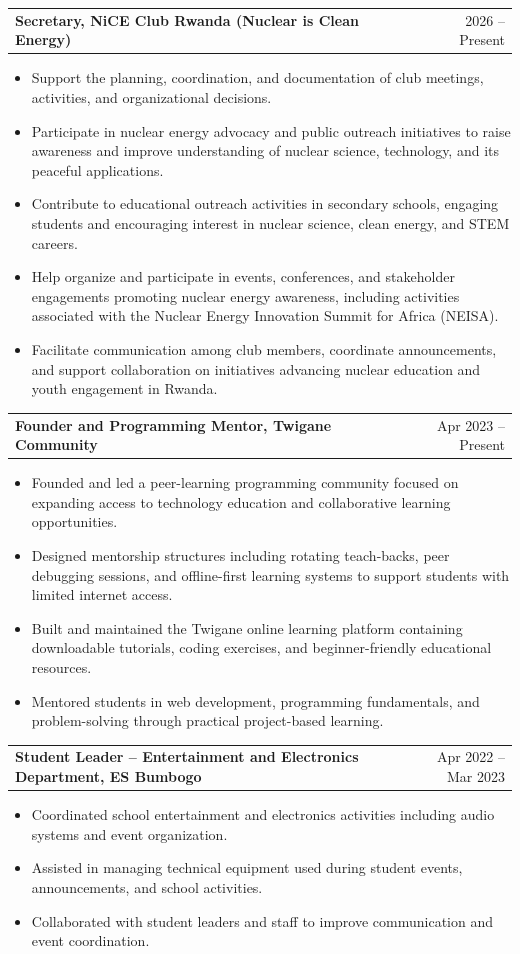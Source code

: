 \documentclass[a4paper,12pt]{article}
\makeatletter
\newenvironment{joblong}[2]
{
\begin{tabularx}{\linewidth}{@{}l X r@{}}
\textbf{#1} & \hfill & #2 \\[3.75pt]
\end{tabularx}
\begin{minipage}[t]{\linewidth}
\begin{itemize}[nosep,after=\strut,leftmargin=1em,itemsep=3pt,label=--]
}
{
\end{itemize}
\end{minipage}
}
\makeatother
\begin{document}
\begin{joblong}{Secretary, NiCE Club Rwanda (Nuclear is Clean Energy)}{2026 -- Present}
\item Support the planning, coordination, and documentation of club meetings, activities, and organizational decisions.
\item Participate in nuclear energy advocacy and public outreach initiatives to raise awareness and improve understanding of nuclear science, technology, and its peaceful applications.
\item Contribute to educational outreach activities in secondary schools, engaging students and encouraging interest in nuclear science, clean energy, and STEM careers.
\item Help organize and participate in events, conferences, and stakeholder engagements promoting nuclear energy awareness, including activities associated with the Nuclear Energy Innovation Summit for Africa (NEISA).
\item Facilitate communication among club members, coordinate announcements, and support collaboration on initiatives advancing nuclear education and youth engagement in Rwanda.
\end{joblong}


\begin{joblong}{Founder and Programming Mentor, Twigane Community}{Apr 2023 -- Present}
\item Founded and led a peer-learning programming community focused on expanding access to technology education and collaborative learning opportunities.
\item Designed mentorship structures including rotating teach-backs, peer debugging sessions, and offline-first learning systems to support students with limited internet access.
\item Built and maintained the Twigane online learning platform containing downloadable tutorials, coding exercises, and beginner-friendly educational resources.
\item Mentored students in web development, programming fundamentals, and problem-solving through practical project-based learning.
\end{joblong}

\begin{joblong}{Student Leader -- Entertainment and Electronics Department, ES Bumbogo}{Apr 2022 -- Mar 2023}
\item Coordinated school entertainment and electronics activities including audio systems and event organization.
\item Assisted in managing technical equipment used during student events, announcements, and school activities.
\item Collaborated with student leaders and staff to improve communication and event coordination.
\end{joblong}
\end{document}
